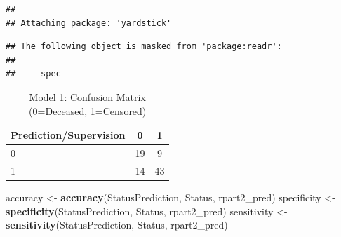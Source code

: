 \documentclass[
]{article}
\newenvironment{Shaded}{\begin{snugshade}}{\end{snugshade}}
\newcommand{\AttributeTok}[1]{\textcolor[rgb]{0.13,0.29,0.53}{#1}}
\newcommand{\CommentTok}[1]{\textcolor[rgb]{0.56,0.35,0.01}{\textit{#1}}}
\newcommand{\ConstantTok}[1]{\textcolor[rgb]{0.56,0.35,0.01}{#1}}
\newcommand{\DecValTok}[1]{\textcolor[rgb]{0.00,0.00,0.81}{#1}}
\newcommand{\FunctionTok}[1]{\textcolor[rgb]{0.13,0.29,0.53}{\textbf{#1}}}
\newcommand{\NormalTok}[1]{#1}
\newcommand{\OtherTok}[1]{\textcolor[rgb]{0.56,0.35,0.01}{#1}}
\newcommand{\SpecialCharTok}[1]{\textcolor[rgb]{0.81,0.36,0.00}{\textbf{#1}}}
\newcommand{\StringTok}[1]{\textcolor[rgb]{0.31,0.60,0.02}{#1}}
\begin{document}
\begin{verbatim}
## 
## Attaching package: 'yardstick'
\end{verbatim}

\begin{verbatim}
## The following object is masked from 'package:readr':
## 
##     spec
\end{verbatim}

\begin{Shaded}
\end{Shaded}

\begin{table}[H]

\caption{\label{tab:unnamed-chunk-23}Model 1: Confusion Matrix (0=Deceased, 1=Censored)}
\centering
\begin{tabular}[t]{lcc}
\toprule
Prediction/Supervision & 0 & 1\\
\midrule
0 & 19 & 9\\
1 & 14 & 43\\
\bottomrule
\end{tabular}
\end{table}

\begin{Shaded}
\begin{Highlighting}[]
\NormalTok{accuracy }\OtherTok{\textless{}{-}} \FunctionTok{accuracy}\NormalTok{(StatusPrediction, Status, rpart2\_pred)}
\NormalTok{specificity }\OtherTok{\textless{}{-}} \FunctionTok{specificity}\NormalTok{(StatusPrediction, Status, rpart2\_pred)}
\NormalTok{sensitivity }\OtherTok{\textless{}{-}} \FunctionTok{sensitivity}\NormalTok{(StatusPrediction, Status, rpart2\_pred)}
\end{Highlighting}
\end{Shaded}
\end{document}
